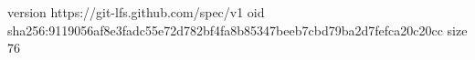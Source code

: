 version https://git-lfs.github.com/spec/v1
oid sha256:9119056af8e3fadc55e72d782bf4fa8b85347beeb7cbd79ba2d7fefca20c20cc
size 76
